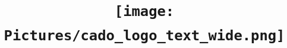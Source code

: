 \documentclass[
12pt, %
a4paper, %
oneside, %
headinclude,footinclude, %
BCOR5mm, %
]{scrartcl}
\title{\texttt{[image: Pictures/cado\_logo\_text\_wide.png]} \\ \normalfont\spacedallcaps{User Guide} \\
\vspace*{\fill}}%
\begin{document}
\newcommand{\titlebox}[2]{
\begin{tikzpicture}
\node[draw,thick,inner sep=6mm] (titlebox) {#2};
\node[fill=white] (Title) at (titlebox.north) {\bfseries \large #1};
\end{tikzpicture}
}
\renewcommand{\sectionmark}[1]{\markright{\spacedlowsmallcaps{#1}}} %

\newcommand{\titledframe}[2]{%
       \boxput*(0,1){\psframebox*{#1}}%
         {\psframebox[framesep=12pt]{#2}}}
         
\pagestyle{scrheadings} %


\date{}
\maketitle %
\thispagestyle{empty}

\setcounter{tocdepth}{2} %
\newpage
\setcounter{page}{1}
\tableofcontents %



\end{document}
